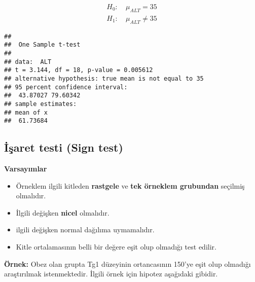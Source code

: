 \documentclass[
]{article}
\newenvironment{Shaded}{\begin{snugshade}}{\end{snugshade}}
\newcommand{\AttributeTok}[1]{\textcolor[rgb]{0.77,0.63,0.00}{#1}}
\newcommand{\CommentTok}[1]{\textcolor[rgb]{0.56,0.35,0.01}{\textit{#1}}}
\newcommand{\DecValTok}[1]{\textcolor[rgb]{0.00,0.00,0.81}{#1}}
\newcommand{\FunctionTok}[1]{\textcolor[rgb]{0.00,0.00,0.00}{#1}}
\newcommand{\NormalTok}[1]{#1}
\newcommand{\SpecialCharTok}[1]{\textcolor[rgb]{0.00,0.00,0.00}{#1}}
\newcommand{\StringTok}[1]{\textcolor[rgb]{0.31,0.60,0.02}{#1}}
\providecommand{\tightlist}{%
  \setlength{\itemsep}{0pt}\setlength{\parskip}{0pt}}
\begin{document}
\begin{align*}
  H_0:&~ \mu_{ALT} = 35 \\
  H_1:&~ \mu_{ALT} \neq 35
\end{align*}

\begin{Shaded}
\end{Shaded}

\begin{verbatim}
## 
##  One Sample t-test
## 
## data:  ALT
## t = 3.144, df = 18, p-value = 0.005612
## alternative hypothesis: true mean is not equal to 35
## 95 percent confidence interval:
##  43.87027 79.60342
## sample estimates:
## mean of x 
##  61.73684
\end{verbatim}

\hypertarget{iux15faret-testi-sign-test}{%
\subsection{İşaret testi (Sign test)}\label{iux15faret-testi-sign-test}}

\textbf{Varsayımlar}

\begin{itemize}
\tightlist
\item
  Örneklem ilgili kitleden \textbf{rastgele} ve \textbf{tek örneklem
  grubundan} seçilmiş olmalıdır.
\item
  İlgili değişken \textbf{nicel} olmalıdır.
\item
  ilgili değişken normal dağılıma uymamalıdır.
\item
  Kitle ortalamasının belli bir değere eşit olup olmadığı test edilir.
\end{itemize}

\textbf{Örnek:} Obez olan grupta Tg1 düzeyinin ortancasının 150'ye eşit
olup olmadığı araştırılmak istenmektedir. İlgili örnek için hipotez
aşağıdaki gibidir.
\end{document}
